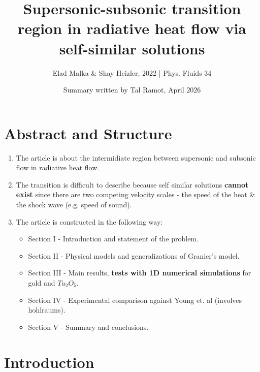\documentclass[11pt]{article}
\title{Supersonic-subsonic transition region in radiative
heat flow via self-similar solutions}
\author{Elad Malka \& Shay Heizler, 2022 | Phys. Fluids 34}
\date{Summary written by Tal Ramot, April 2026}
\begin{document}
\maketitle
\section*{Abstract and Structure}
\begin{enumerate}
  \item The article is about the intermidiate region between supersonic and subsonic flow in radiative heat flow.
  \item The transition is difficult to describe because self similar solutions \textbf{cannot exist} since there are two competing velocity scales - the speed of the heat \& the shock wave (e.g. speed of sound).
  \item The article is constructed in the following way:
  \begin{itemize}
    \item Section I - Introduction and statement of the problem.
    \item Section II - Physical models and generalizations of Granier's model.
    \item Section III - Main results, \textbf{tests with 1D numerical simulations} for gold and $Ta_2O_5$.
    \item Section IV - Experimental comparison against Young et. al (involves hohlraums).
    \item Section V - Summary and conclusions.
  \end{itemize}
\end{enumerate}

\section{Introduction}
\end{document}
